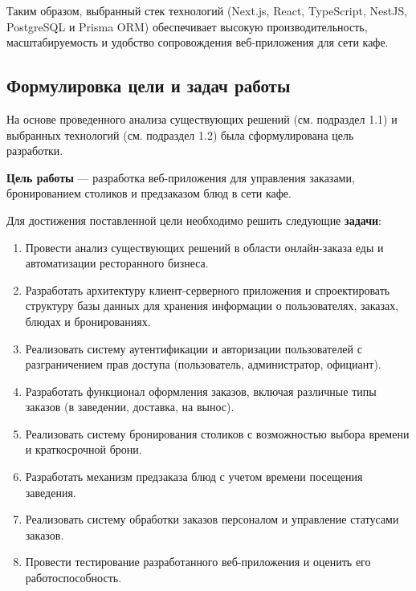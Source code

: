 Таким образом, выбранный стек технологий (Next.js, React, TypeScript, NestJS, PostgreSQL и Prisma ORM) обеспечивает высокую производительность, масштабируемость и удобство сопровождения веб-приложения для сети кафе.


\subsection{Формулировка цели и задач работы}

На основе проведенного анализа существующих решений (см. подраздел 1.1) и выбранных технологий (см. подраздел 1.2) была сформулирована цель разработки.

\textbf{Цель работы} --- разработка веб-приложения для управления заказами, бронированием столиков и предзаказом блюд в сети кафе.

Для достижения поставленной цели необходимо решить следующие \textbf{задачи}:

\begin{enumerate}
	\item Провести анализ существующих решений в области онлайн-заказа еды и автоматизации ресторанного бизнеса.
	
	\item Разработать архитектуру клиент-серверного приложения и спроектировать структуру базы данных для хранения информации о пользователях, заказах, блюдах и бронированиях.
	
	\item Реализовать систему аутентификации и авторизации пользователей с разграничением прав доступа (пользователь, администратор, официант).
	
	\item Разработать функционал оформления заказов, включая различные типы заказов (в заведении, доставка, на вынос).
	
	\item Реализовать систему бронирования столиков с возможностью выбора времени и краткосрочной брони.
	
	\item Разработать механизм предзаказа блюд с учетом времени посещения заведения.
	
	\item Реализовать систему обработки заказов персоналом и управление статусами заказов.
	
	\item Провести тестирование разработанного веб-приложения и оценить его работоспособность.
\end{enumerate}